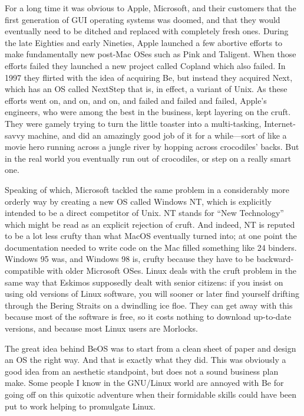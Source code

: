 \documentclass[
  fontsize=11pt,
  paper=landscape,
  twocolumn=true,
  pagesize=pdftex,
  headings=small,
  DIV=15,
  ]{scrartcl}
\begin{document}
For a long time it was obvious to Apple, Microsoft, and their customers
that the first generation of GUI operating systems was doomed, and that
they would eventually need to be ditched and replaced with completely
fresh ones. During the late Eighties and early Nineties, Apple launched
a few abortive efforts to make fundamentally new post-Mac OSes such as
Pink and Taligent. When those efforts failed they launched a new project
called Copland which also failed. In 1997 they flirted with the idea of
acquiring Be, but instead they acquired Next, which has an OS called
NextStep that is, in effect, a variant of Unix. As these efforts went
on, and on, and on, and failed and failed and failed, Apple's engineers,
who were among the best in the business, kept layering on the cruft.
They were gamely trying to turn the little toaster into a multi-tasking,
Internet-savvy machine, and did an amazingly good job of it for a
while---sort of like a movie hero running across a jungle river by
hopping across crocodiles' backs. But in the real world you eventually
run out of crocodiles, or step on a really smart one.

Speaking of which, Microsoft tackled the same problem in a considerably
more orderly way by creating a new OS called Windows NT, which is
explicitly intended to be a direct competitor of Unix. NT stands for
``New Technology'' which might be read as an explicit rejection of
cruft. And indeed, NT is reputed to be a lot less crufty than what MacOS
eventually turned into; at one point the documentation needed to write
code on the Mac filled something like 24 binders. Windows 95 was, and
Windows 98 is, crufty because they have to be backward-compatible with
older Microsoft OSes. Linux deals with the cruft problem in the same way
that Eskimos supposedly dealt with senior citizens: if you insist on
using old versions of Linux software, you will sooner or later find
yourself drifting through the Bering Straits on a dwindling ice floe.
They can get away with this because most of the software is free, so it
costs nothing to download up-to-date versions, and because most Linux
users are Morlocks.

The great idea behind BeOS was to start from a clean sheet of paper and
design an OS the right way. And that is exactly what they did. This was
obviously a good idea from an aesthetic standpoint, but does not a sound
business plan make. Some people I know in the GNU/Linux world are
annoyed with Be for going off on this quixotic adventure when their
formidable skills could have been put to work helping to promulgate
Linux.
\end{document}
